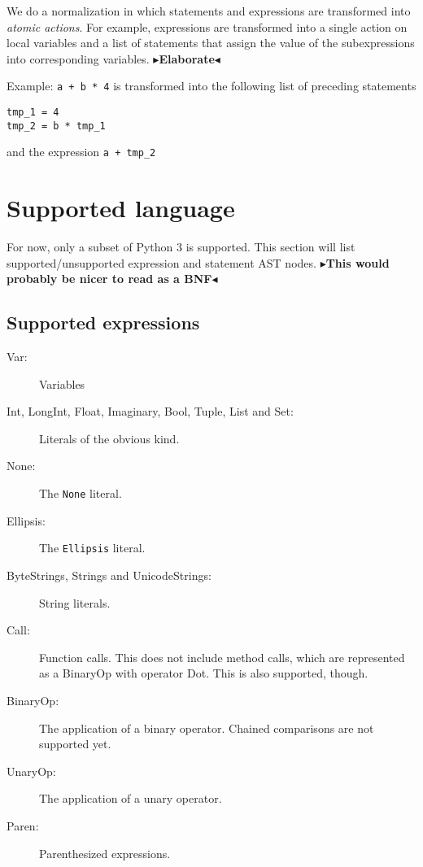 \documentclass[11pt]{report}
\newcommand{\todo}[1]{{\color[rgb]{.5,0,0}\textbf{$\blacktriangleright$#1$\blacktriangleleft$}}}
\begin{document}
We do a normalization in which statements and expressions are
transformed into \emph{atomic actions}. For example, expressions are
transformed into a single action on local variables and a list of
statements that assign the value of the subexpressions into
corresponding variables. \todo{Elaborate}

Example: \verb!a + b * 4! is transformed into the following list of
preceding statements
\begin{verbatim}
tmp_1 = 4
tmp_2 = b * tmp_1
\end{verbatim}
and the expression \verb!a + tmp_2!

\section{Supported language}
For now, only a subset of Python 3 is supported. This section will
list supported/unsupported expression and statement AST nodes.
\todo{This would probably be nicer to read as a BNF}

\subsection{Supported expressions}
\begin{description}
  \item[Var:] Variables
  \item[Int, LongInt, Float, Imaginary, Bool, Tuple, List and Set:]
    Literals of the obvious kind.
  \item[None:] The \verb|None| literal.
  \item[Ellipsis:] The \verb|Ellipsis| literal.
  \item[ByteStrings, Strings and UnicodeStrings:] String literals.
  \item[Call:] Function calls. This does not include method calls,
    which are represented as a BinaryOp with operator Dot. This is
    also supported, though.
  \item[BinaryOp:] The application of a binary operator. Chained
    comparisons are not supported yet.
  \item[UnaryOp:] The application of a unary operator.
  \item[Paren:] Parenthesized expressions.
\end{description}
\end{document}
